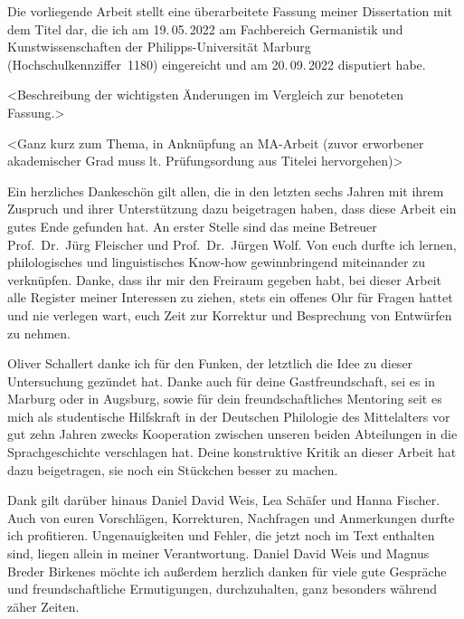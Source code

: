 \addchap{\lsPrefaceTitle}

Die vorliegende Arbeit stellt eine überarbeitete Fassung meiner Dissertation
mit dem Titel  dar, die ich am 19.\,05.\,2022 am Fachbereich
Germanistik und Kunstwissenschaften der Philipps-Universität Marburg
(Hochschulkennziffer~1180) eingereicht und am 20.\,09.\,2022 disputiert habe.

<Beschreibung der wichtigsten Änderungen im Vergleich zur benoteten Fassung.>

<Ganz kurz zum Thema, in Anknüpfung an MA-Arbeit (zuvor erworbener akademischer
Grad muss lt. Prüfungsordung aus Titelei hervorgehen)>

Ein herzliches Dankeschön gilt allen, die in den letzten sechs Jahren mit ihrem
Zuspruch und ihrer Unterstützung dazu beigetragen haben, dass diese Arbeit ein
gutes Ende gefunden hat. An erster Stelle sind das meine Betreuer
Prof.~Dr.~Jürg Fleischer und Prof.~Dr.~Jürgen Wolf. Von euch durfte ich lernen,
philologisches und linguistisches Know-how gewinnbringend miteinander zu
verknüpfen. Danke, dass ihr mir den Freiraum gegeben habt, bei dieser Arbeit
alle Register meiner Interessen zu ziehen, stets ein offenes Ohr für Fragen
hattet und nie verlegen wart, euch Zeit zur Korrektur und Besprechung von
Entwürfen zu nehmen.

Oliver Schallert danke ich für den Funken, der letztlich die Idee zu dieser
Untersuchung gezündet hat. Danke auch für deine Gastfreundschaft, sei es in
Marburg oder in Augsburg, sowie für dein freundschaftliches Mentoring seit es
mich als studentische Hilfskraft in der Deutschen Philologie des Mittelalters
vor gut zehn Jahren zwecks Kooperation zwischen unseren beiden Abteilungen in
die Sprachgeschichte verschlagen hat. Deine konstruktive Kritik an dieser
Arbeit hat dazu beigetragen, sie noch ein Stückchen besser zu machen.

Dank gilt darüber hinaus Daniel David Weis, Lea Schäfer und Hanna Fischer. Auch
von euren Vorschlägen, Korrekturen, Nachfragen und Anmerkungen durfte ich
profitieren. Ungenauigkeiten und Fehler, die jetzt noch im Text enthalten sind,
liegen allein in meiner Verantwortung. Daniel David Weis und Magnus Breder
Birkenes möchte ich außerdem herzlich danken für viele gute Gespräche und
freundschaftliche Ermutigungen, durchzuhalten, ganz besonders während zäher
Zeiten.

